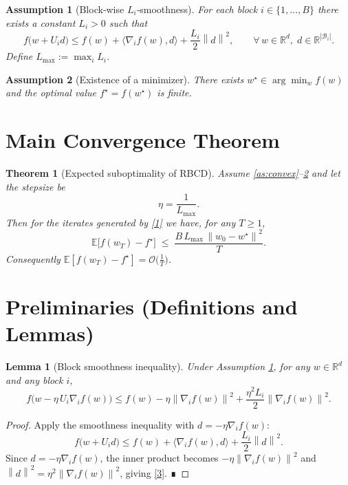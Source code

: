 \documentclass{article}
\newtheorem{theorem}{Theorem}
\newtheorem{lemma}{Lemma}
\newtheorem{assumption}{Assumption}
\newcommand{\E}{\mathbb{E}}
\newcommand{\R}{\mathbb{R}}
\newcommand{\norm}[1]{\left\lVert #1\right\rVert}
\newcommand{\ip}[2]{\langle #1 , #2\rangle}
\newcommand{\block}[1]{U_{#1}}
\begin{document}
\begin{assumption}[Block‑wise $L_{i}$‑smoothness]\label{as:smooth}
For each block $i\in\{1,\dots ,B\}$ there exists a constant $L_{i}>0$ such that
\[
f\bigl(w+\block{i}d\bigr)\le
f(w)+\ip{\nabla_{i}f(w)}{d}+\frac{L_{i}}{2}\norm{d}^{2},
\qquad\forall\,w\in\R^{d},\; d\in\R^{|\mathcal{B}_{i}|}.
\]
Define $L_{\max}:=\max_{i}L_{i}$.
\end{assumption}

\begin{assumption}[Existence of a minimizer]\label{as:opt}
There exists $w^{\star}\in\arg\min_{w}f(w)$ and the optimal value $f^{\star}=f(w^{\star})$ is finite.
\end{assumption}

\section*{Main Convergence Theorem}
\begin{theorem}[Expected suboptimality of RBCD]\label{thm:rate}
Assume \ref{as:convex}–\ref{as:opt} and let the stepsize be
\[
\eta = \frac{1}{L_{\max}} .
\]
Then for the iterates generated by \eqref{1} we have, for any $T\ge 1$,
\[
\E\bigl[f(w_{T})-f^{\star}\bigr]\;\le\;
\frac{B\,L_{\max}\,\norm{w_{0}-w^{\star}}^{2}}{T}.
\tag{2}
\]
Consequently $ \E[f(w_{T})-f^{\star}]=\mathcal{O}\!\bigl(\tfrac{1}{T}\bigr) $.
\end{theorem}

\section*{Preliminaries (Definitions and Lemmas)}
\begin{lemma}[Block smoothness inequality]\label{lem:smooth}
Under Assumption \ref{as:smooth}, for any $w\in\R^{d}$ and any block $i$,
\[
f\!\bigl(w-\eta\,\block{i}\nabla_{i}f(w)\bigr)
\le f(w)-\eta \norm{\nabla_{i}f(w)}^{2}
+\frac{\eta^{2}L_{i}}{2}\norm{\nabla_{i}f(w)}^{2}.
\tag{3}
\]
\end{lemma}
\begin{proof}
Apply the smoothness inequality with $d=-\eta\nabla_{i}f(w)$:
\[
f\bigl(w+\block{i}d\bigr)\le f(w)+\ip{\nabla_{i}f(w)}{d}
+\frac{L_{i}}{2}\norm{d}^{2}.
\]
Since $d=-\eta\nabla_{i}f(w)$, the inner product becomes $-\eta\norm{\nabla_{i}f(w)}^{2}$ and
$\norm{d}^{2}= \eta^{2}\norm{\nabla_{i}f(w)}^{2}$, giving \eqref{3}. ∎
\end{proof}
\end{document}
